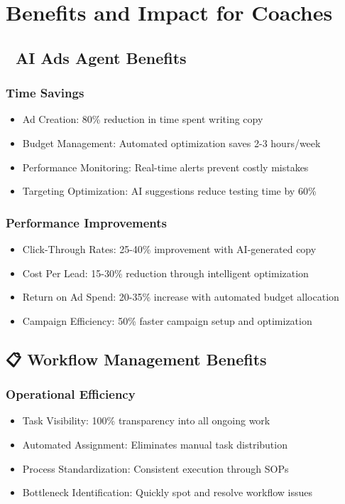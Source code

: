 \documentclass[12pt,a4paper]{article}
\begin{document}
\section{Benefits and Impact for Coaches}

\subsection{🤖 AI Ads Agent Benefits}

\subsubsection{Time Savings}
\begin{itemize}
    \item Ad Creation: 80\% reduction in time spent writing copy
    \item Budget Management: Automated optimization saves 2-3 hours/week
    \item Performance Monitoring: Real-time alerts prevent costly mistakes
    \item Targeting Optimization: AI suggestions reduce testing time by 60\%
\end{itemize}

\subsubsection{Performance Improvements}
\begin{itemize}
    \item Click-Through Rates: 25-40\% improvement with AI-generated copy
    \item Cost Per Lead: 15-30\% reduction through intelligent optimization
    \item Return on Ad Spend: 20-35\% increase with automated budget allocation
    \item Campaign Efficiency: 50\% faster campaign setup and optimization
\end{itemize}

\subsection{📋 Workflow Management Benefits}

\subsubsection{Operational Efficiency}
\begin{itemize}
    \item Task Visibility: 100\% transparency into all ongoing work
    \item Automated Assignment: Eliminates manual task distribution
    \item Process Standardization: Consistent execution through SOPs
    \item Bottleneck Identification: Quickly spot and resolve workflow issues
\end{itemize}
\end{document}
